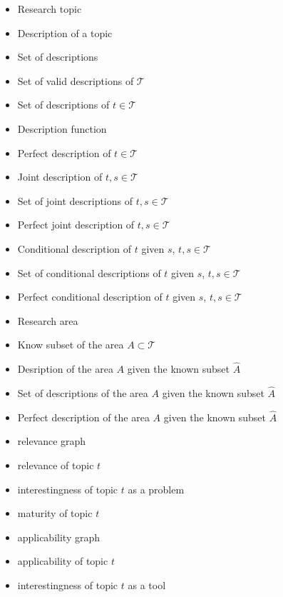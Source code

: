 \begin{itemize}[leftmargin=1.5cm]
\item [$t \in \mathcal{T}$] Research topic
\item [$d \in \mathcal{D}_t$] Description of a topic
\item [$\mathcal{D}$] Set of descriptions
\item [$\mathcal{D}_{\mathcal{T}}$] Set of valid descriptions of $\mathcal{T}$
\item [$\mathcal{D}_t$] Set of descriptions of $t \in \mathcal{T}$
\item [$\delta$] Description function
\item [$d_{t}^{\star}$] Perfect description of $t \in \mathcal{T}$
\item [$d_{t,s}$] Joint description of $t, s \in \mathcal{T}$
\item [$\mathcal{D}_{t,s}$] Set of joint descriptions of $t, s \in \mathcal{T}$
\item [$d_{t,s}^{\star}$] Perfect joint description of $t, s \in \mathcal{T}$
\item [$d_{t \mid s^\star}$] Conditional description of $t$ given $s$, $t, s \in \mathcal{T}$
\item [$\mathcal{D}_{t \mid s^\star}$] Set of conditional descriptions of $t$ given $s$, $t, s \in \mathcal{T}$
\item [$d_{t \mid s^\star}^{\star}$] Perfect conditional description of $t$ given $s$, $t, s \in \mathcal{T}$
\item [$A \subset \mathcal{T}$] Research area
\item [$\hat{A}$] Know subset of the area $A \subset \mathcal{T}$
\item [$\mathcal{D}_{\hat{A}}$] Desription of the area $A$ given the known subset $\hat{A}$
\item [$\mathcal{D}_{\hat{A}}$] Set of descriptions of the area $A$ given the known subset $\hat{A}$
\item [$d_{\hat{A}}^{\star}$] Perfect description of the area $A$ given the known subset $\hat{A}$

%
%

\bigskip

\item [$RG$] relevance graph
\item [$R_{t}$] relevance of topic $t$
\item [$IP_{t}$] interestingness of topic $t$ as a problem
\item [$M_{t}$] maturity of topic $t$
\item [$AG$] applicability graph
\item [$A_{t}$] applicability of topic $t$
\item [$IT_{t}$] interestingness of topic $t$ as a tool


\end{itemize}
